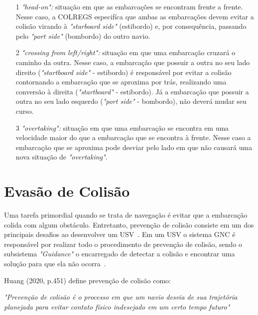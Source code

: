         \begin{enumerate}
            \item [1] \textit{"head-on":} situação em que as embarcações se encontram frente a frente. Nesse caso, a COLREGS especifíca que ambas as embarcações devem evitar a colisão virando à \textit{"starboard side"} (estibordo) e, por consequência, passando pelo \textit{"port side"} (bombordo) do outro navio.
            
            \item [2] \textit{"crossing from left/right":} situação em que uma embarcação cruzará o caminho da outra. Nesse caso, a embarcação que possuir a outra no seu lado direito (\textit{"startboard side"} - estibordo) é responsável por evitar a colisão contornando a embarcação que se aproxima por trás, realizando uma conversão à direita (\textit{"startboard"} - estibordo). Já a embarcação que possuir a outra no seu lado esquerdo (\textit{"port side"} - bombordo), não deverá mudar seu curso.
            
            \item [3] \textit{"overtaking":} situação em que uma embarcação se encontra em uma velocidade maior do que a embarcação que se encontra à frente. Nesse caso a embarcação que se aproxima pode desviar pelo lado em que não causará uma nova situação de \textit{"overtaking"}.
        \end{enumerate}
    
    \section{Evasão de Colisão}\label{subchap2:prev_col}
        Uma tarefa primordial quando se trata de navegação é evitar que a embarcação colida com algum obstáculo. Entretanto, prevenção de colisão consiste em um dos principais desafios ao desenvolver um USV~\cite{JURAK2020}. Em um USV o sistema GNC é responsável por realizar todo o procedimento de prevenção de colisão, sendo o subsistema \textit{"Guidance"} o encarregado de detectar a colisão e encontrar uma solução para que ela não ocorra~\cite{HUANG2020451}.
        
        Huang \etal (2020, p.451) define prevenção de colisão como:
        \begin{directcite}
            \textit{"Prevenção de colisão é o processo em que um navio desvia de sua trajetória planejada para evitar contato físico indesejado em um certo tempo futuro"}
        \end{directcite}
        
